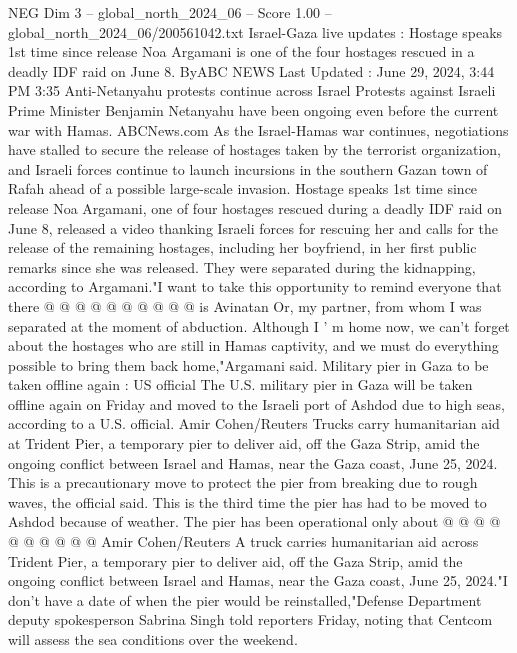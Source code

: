 \begin{textsample}{NEG Dim 3 – global\_north\_2024\_06 – Score 1.00 – global\_north\_2024\_06/200561042.txt}  \label{ex:f3_neg_383}
Israel-Gaza live updates : Hostage speaks 1st time since release Noa Argamani is one of the four hostages rescued in a deadly IDF raid on June 8.
ByABC NEWS Last Updated : June 29, 2024, 3:44 PM 3:35 Anti-Netanyahu protests continue across Israel Protests against Israeli Prime Minister Benjamin Netanyahu have been ongoing even before the current war with Hamas.
ABCNews.com As the Israel-Hamas war continues, negotiations have stalled to secure the release of hostages taken by the terrorist organization, and Israeli forces continue to launch incursions in the southern Gazan town of Rafah ahead of a possible large-scale invasion.
Hostage speaks 1st time since release Noa Argamani, one of four hostages rescued during a deadly IDF raid on June 8, released a video thanking Israeli forces for rescuing her and calls for the release of the remaining hostages, including her boyfriend, in her first public remarks since she was released.
They were separated during the kidnapping, according to Argamani."I want to take this opportunity to remind everyone that there @ @ @ @ @ @ @ @ @ @ is Avinatan Or, my partner, from whom I was separated at the moment of abduction.
Although I ' m home now, we can't forget about the hostages who are still in Hamas captivity, and we must do everything possible to bring them back home,"Argamani said.
Military pier in Gaza to be taken offline again : US official The U.S. military pier in Gaza will be taken offline again on Friday and moved to the Israeli port of Ashdod due to high seas, according to a U.S. official.
Amir Cohen/Reuters Trucks carry humanitarian aid at Trident Pier, a temporary pier to deliver aid, off the Gaza Strip, amid the ongoing conflict between Israel and Hamas, near the Gaza coast, June 25, 2024.
This is a precautionary move to protect the pier from breaking due to rough waves, the official said.
This is the third time the pier has had to be moved to Ashdod because of weather.
The pier has been operational only about @ @ @ @ @ @ @ @ @ @ Amir Cohen/Reuters A truck carries humanitarian aid across Trident Pier, a temporary pier to deliver aid, off the Gaza Strip, amid the ongoing conflict between Israel and Hamas, near the Gaza coast, June 25, 2024."I don't have a date of when the pier would be reinstalled,"Defense Department deputy spokesperson Sabrina Singh told reporters Friday, noting that Centcom will assess the sea conditions over the weekend.

\end{textsample}
